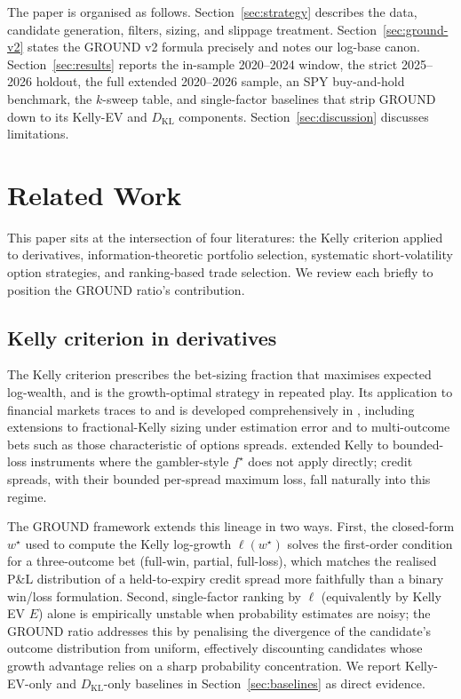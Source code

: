 \documentclass[11pt]{article}
\begin{document}
The paper is organised as follows. Section~\ref{sec:strategy} describes
the data, candidate generation, filters, sizing, and slippage treatment.
Section~\ref{sec:ground-v2} states the GROUND v2 formula precisely and
notes our log-base canon. Section~\ref{sec:results} reports the in-sample
2020--2024 window, the strict 2025--2026 holdout, the full extended
2020--2026 sample, an SPY buy-and-hold benchmark, the $k$-sweep table, and
single-factor baselines that strip GROUND down to its Kelly-EV and
$D_{\mathrm{KL}}$ components. Section~\ref{sec:discussion} discusses
limitations.


\section{Related Work}\label{sec:related}

This paper sits at the intersection of four literatures: the Kelly criterion
applied to derivatives, information-theoretic portfolio selection, systematic
short-volatility option strategies, and ranking-based trade selection. We
review each briefly to position the GROUND ratio's contribution.

\subsection{Kelly criterion in derivatives}

The Kelly criterion \citep{kelly1956} prescribes the bet-sizing fraction that
maximises expected log-wealth, and is the growth-optimal strategy in repeated
play. Its application to financial markets traces to \citet{thorp2006} and is
developed comprehensively in \citet{maclean2011}, including extensions to
fractional-Kelly sizing under estimation error and to multi-outcome bets such
as those characteristic of options spreads. \citet{vince1990} extended Kelly
to bounded-loss instruments where the gambler-style $f^\star$ does not apply
directly; credit spreads, with their bounded per-spread maximum loss, fall
naturally into this regime.

The GROUND framework extends this lineage in two ways. First, the closed-form
$w^\star$ used to compute the Kelly log-growth $\ell(w^\star)$ solves the
first-order condition for a three-outcome bet (full-win, partial,
full-loss), which matches the realised P\&L distribution of a
held-to-expiry credit spread more faithfully than a binary win/loss
formulation. Second, single-factor ranking by $\ell$ (equivalently by
Kelly EV $E$) alone is empirically unstable when probability estimates
are noisy; the GROUND ratio addresses this by penalising the divergence
of the candidate's outcome distribution from uniform, effectively
discounting candidates whose growth advantage relies on a sharp
probability concentration. We report Kelly-EV-only and
$D_{\mathrm{KL}}$-only baselines in Section~\ref{sec:baselines} as
direct evidence.
\end{document}

